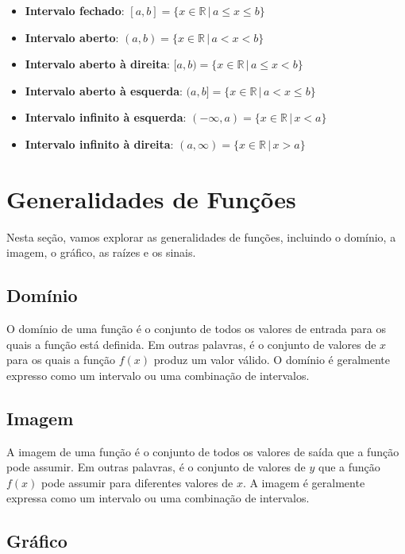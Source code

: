 \documentclass[12pt]{article}
\begin{document}
\begin{itemize}
    \item \textbf{Intervalo fechado}: $[a, b] = \{x \in \mathbb{R} \,|\, a \leq x \leq b\}$
    \item \textbf{Intervalo aberto}: $(a, b) = \{x \in \mathbb{R} \,|\, a < x < b\}$
    \item \textbf{Intervalo aberto à direita}: $[a, b) = \{x \in \mathbb{R} \,|\, a \leq x < b\}$
    \item \textbf{Intervalo aberto à esquerda}: $(a, b] = \{x \in \mathbb{R} \,|\, a < x \leq b\}$
    \item \textbf{Intervalo infinito à esquerda}: $(-\infty, a) = \{x \in \mathbb{R} \,|\, x < a\}$
    \item \textbf{Intervalo infinito à direita}: $(a, \infty) = \{x \in \mathbb{R} \,|\, x > a\}$
\end{itemize}


\section{Generalidades de Funções}

Nesta seção, vamos explorar as generalidades de funções, incluindo o domínio, a imagem, o gráfico, as raízes e os sinais.

\subsection{Domínio}

O domínio de uma função é o conjunto de todos os valores de entrada para os quais a função está definida. Em outras palavras, é o conjunto de valores de $x$ para os quais a função $f(x)$ produz um valor válido. O domínio é geralmente expresso como um intervalo ou uma combinação de intervalos.

\subsection{Imagem}

A imagem de uma função é o conjunto de todos os valores de saída que a função pode assumir. Em outras palavras, é o conjunto de valores de $y$ que a função $f(x)$ pode assumir para diferentes valores de $x$. A imagem é geralmente expressa como um intervalo ou uma combinação de intervalos.

\subsection{Gráfico}
\end{document}
